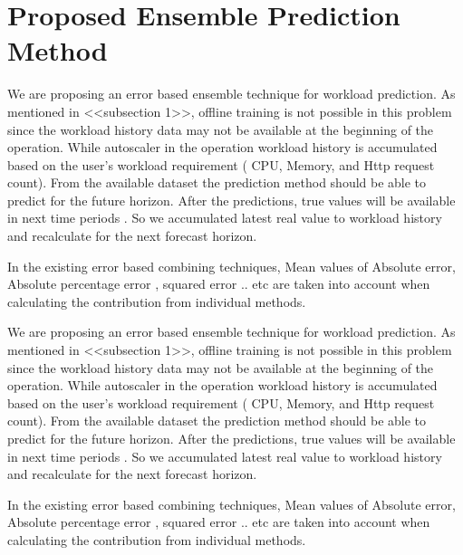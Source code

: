 \section{Proposed Ensemble Prediction Method}

We are proposing an error based ensemble technique for workload prediction. As mentioned in <<subsection 1>>, 
offline training is not possible in this problem since the  workload history data may not be available at the 
beginning of the operation. While autoscaler in the operation workload history  is accumulated based on the user's 
workload requirement ( CPU, Memory, and Http request count). From the available dataset the prediction method 
should be able to predict for the future horizon. After the predictions, true values will be available in next time 
periods . So we accumulated latest real value to workload history and recalculate for the next forecast horizon. 
        
    In the existing error based combining techniques, Mean values of Absolute error, Absolute percentage error , 
squared error .. etc are taken into account when calculating the contribution from individual methods. 


We are proposing an error based ensemble technique for workload prediction. As mentioned in <<subsection 1>>, offline training is not possible in this problem since the  workload history data may not be available at the beginning of the operation. While autoscaler in the operation workload history  is accumulated based on the user's workload requirement ( CPU, Memory, and Http request count). From the available dataset the prediction method should be able to predict for the future horizon. After the predictions, true values will be available in next time periods . So we accumulated latest real value to workload history and recalculate for the next forecast horizon. 
		
	In the existing error based combining techniques, Mean values of Absolute error, Absolute percentage error , squared error .. etc are taken into account when calculating the contribution from individual methods. 



